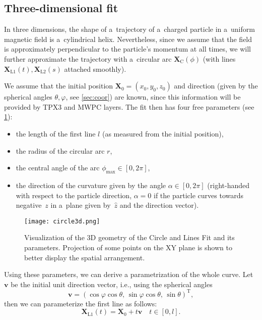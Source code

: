 		\subsection{Three-dimensional fit}
			In three dimensions, the shape of a~trajectory of a~charged particle in a~uniform magnetic field is a~cylindrical helix. Nevertheless, since we assume that the field is approximately perpendicular to the particle's momentum at all times, we will further approximate the trajectory with a~circular arc $\mathbf{X}_\text{C}(\phi)$ (with lines $\mathbf{X}_\text{L1}(t),\mathbf{X}_\text{L2}(s)$ attached smoothly).
			
			We assume that the initial position $\mathbf{X}_0 = (x_0,y_0,z_0)$ and direction (given by the spherical angles $\theta,\varphi$, see \cref{sec:coor}) are known, since this information will be provided by \ac{TPX3} and \ac{MWPC} layers. The fit then has four free parameters (see \cref{fig:circle3d}):
				\begin{itemize}[nosep]
					\item the length of the first line $l$ (as measured from the initial position),
					\item the radius of the circular arc $r$,
					\item the central angle of the arc $\phi_\text{max} \in [0,2\pi]$,
					\item the direction of the curvature given by the angle $\alpha \in [0,2\pi]$ (right-handed with respect to the particle direction, $\alpha = 0$ if the particle curves towards negative~$z$ in a~plane given by~$\hat{z}$ and the direction vector).
				\end{itemize}
			\begin{figure}
				\centering
				\texttt{[image: circle3d.png]}
				\caption{Visualization of the 3D geometry of the Circle and Lines Fit and its parameters. Projection of some points on the XY plane is shown to better display the spatial arrangement.}
				\label{fig:circle3d}
			\end{figure}
			Using these parameters, we can derive a parametrization of the whole curve. Let $\mathbf{v}$ be the initial unit direction vector, i.e., using the spherical angles
				\begin{equation}
					\mathbf{v} = (\cos\varphi\cos\theta, \,\sin\varphi\cos\theta, \,\sin\theta)^\mathrm{T},
				\end{equation}
			then we can parameterize the first line as follows:
				\begin{equation}
					\mathbf{X}_\text{L1}(t) = \mathbf{X}_0 + t\mathbf{v} \quad t\in[0,l].
				\end{equation}
